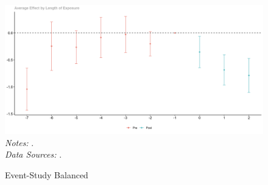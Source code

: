 

\begin{figure}[H]
\caption{Event-Study Balanced}
\centering
\begin{minipage}{\textwidth} %
 \includegraphics[width=\textwidth]{../../results/figures/fig1_eventStudyBalanced.png}
\scriptsize
\RaggedRight
\textit{Notes:} . \\
\textit{Data Sources:} \citep{mma2017list, inpe2020prodes}.
\end{minipage}
\label{fig:eventStudyBalanced}
\end{figure}
